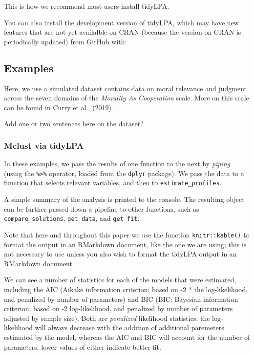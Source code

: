 \documentclass[man]{apa6}
\begin{document}
This is how we recommend most users install tidyLPA.

You can also install the development version of tidyLPA, which may have new features that are not yet availalble on CRAN (because the version on CRAN is periodically updated) from GitHub with:

\hypertarget{examples}{%
\subsection{Examples}\label{examples}}

Here, we use a simulated dataset contains data on moral relevance and judgment across the seven domains of the \emph{Morality As Cooperation} scale. More on this scale can be found in Curry et al., (2019).

Add one or two sentences here on the dataset?

\hypertarget{mclust-via-tidylpa}{%
\subsubsection{Mclust via tidyLPA}\label{mclust-via-tidylpa}}

In these examples, we pass the results of one function to the next by \emph{piping}
(using the \texttt{\%\textgreater{}\%} operator, loaded from the \texttt{dplyr} package). We pass the data to
a function that selects relevant variables, and then to \texttt{estimate\_profiles}.

A simple summary of the analysis is printed to the console. The resulting object
can be further passed down a pipeline to other functions, such as
\texttt{compare\_solutions}, \texttt{get\_data}, and \texttt{get\_fit}.

Note that here and throughout this paper we use the function \texttt{knitr::kable()} to
format the output in an RMarkdown document, like the one we are using; this is
not necessary to use unless you also wish to format the tidyLPA output in an
RMarkdown document.

We can see a number of statistics for each of the models that were estimated, including the
AIC (Aikake information criterion; based on -2 * the log-likelihood, and penalized by number of parameters) and BIC (BIC: Bayesian information criterion; based on -2 log-likelihood, and penalized by number of parameters adjusted by sample size). Both are \emph{penalized} likelihood statistics; the log-likelihood will always decrease with the addition of additional
paremeters estimated by the model, whereas the AIC and BIC will account for the number of parameters; lower values of
either indicate better fit.
\end{document}
